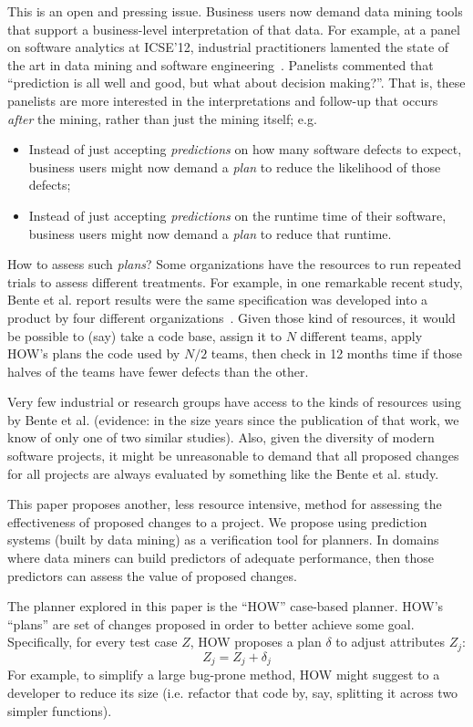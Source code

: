 \documentclass[conference]{IEEEtran}
\newcommand{\bi}{\begin{itemize}}
\newcommand{\ei}{\end{itemize}}
\begin{document}
This is an open and pressing issue.
Business  users   now demand   data mining tools
that  support a  business-level
interpretation of that data. For example,
at a  panel on software analytics at ICSE'12,
industrial practitioners lamented the state of the art in data mining
and software engineering~\cite{menzies12a}. Panelists commented that
``prediction is all well and good, but what about decision
making?''. That is, these panelists are more interested in the interpretations
and follow-up
that occurs {\em after} the mining, rather than just  the mining itself; e.g.
\bi
\item 
Instead of just accepting  {\em predictions} on how many 
 software defects
to expect,  business users might now demand a {\em plan} to
reduce the likelihood of those defects;
\item Instead of just accepting {\em predictions} on the runtime
time of their software, business users might now demand
a {\em plan} to reduce that runtime.
\ei
How to assess such {\em plans}?
Some organizations have the resources to 
run repeated trials to assess  different treatments.
For example, in one remarkable recent study, Bente et al. report results
were the same specification was developed into a product by four different organizations~\cite{Anda2009}. Given those kind of resources, it would be possible
to (say) take a code base, assign it to $N$ different teams, apply
HOW's plans the code used by  $N/2$ teams, then check in 12 months time
if those halves of the teams have fewer defects than the other.  

Very few industrial or research groups have access
to the kinds of resources using by Bente et al. (evidence: in the size years since the
publication of that work, we know of only one of two similar studies). Also, given the
diversity of modern software projects, it might be unreasonable to demand that all
proposed changes for all projects are always evaluated by something like the Bente et al. study.

This paper proposes another, less resource intensive,  method for assessing the effectiveness of proposed
changes to a project.  
We propose using prediction systems (built by data mining) as a verification
tool for planners. In domains where  data miners can build
predictors of adequate performance, then those predictors can assess the value
of proposed changes.
 
The planner explored in this paper is the ``HOW'' case-based planner.
HOW's  ``plans'' are  set of changes
proposed  in order to better achieve some goal. 
Specifically, for every test case $Z$, HOW proposes a  plan $\delta$ to
  adjust   attributes $Z_j$:
\begin{equation}\label{eq:one}
Z_j = Z_j + \delta_j
\end{equation}
For example, to simplify a  large bug-prone  method, HOW might suggest
to a developer to reduce its size (i.e.  refactor that code by, say, splitting it across
two simpler functions).
\end{document}
